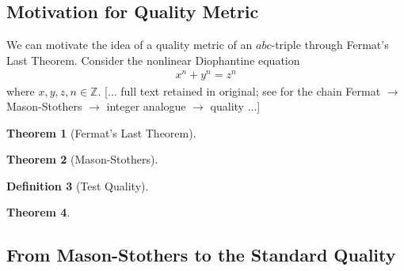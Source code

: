\documentclass[11pt,letterpaper]{amsart}
\newtheorem{theorem}{Theorem}[section]
\newtheorem{definition}[theorem]{Definition}
\begin{document}
\subsection{Motivation for Quality Metric}
We can motivate the idea of a quality metric of an $abc$-triple through Fermat's Last Theorem. Consider the nonlinear Diophantine equation
\begin{align}\label{E_Fermat_Equation} x^n + y^n = z^n \end{align}
where $x, y, z, n \in \mathbb{Z}$. [... full text retained in original; see \cite{wiles1995, granville2002, mason1984, stothers1981} for the chain Fermat $\to$ Mason-Stothers $\to$ integer analogue $\to$ quality ...]
\begin{theorem}[Fermat's Last Theorem]\label{T_FLT}\end{theorem}
\begin{theorem}[Mason-Stothers]\label{T_Mason}\end{theorem}
\begin{definition}[Test Quality]\label{D_Test_Quality}\end{definition}
\begin{theorem}\label{T_test_quality}\end{theorem}
\fi

\subsection{From Mason-Stothers to the Standard Quality}
\end{document}
